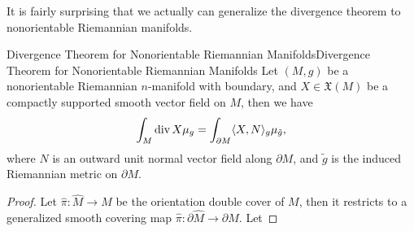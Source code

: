 \documentclass[../main.tex]{subfiles}
\begin{document}
It is fairly surprising that we actually can generalize the divergence theorem to nonorientable Riemannian manifolds.

\begin{theorem}{Divergence Theorem for Nonorientable Riemannian Manifolds}{Divergence Theorem for Nonorientable Riemannian Manifolds}
  Let $(M,g)$ be a nonorientable Riemannian $n$-manifold with boundary, and $X \in \mathfrak{X}(M)$ be a compactly supported smooth vector field on $M$, then we have
  \begin{equation}
    \int_M \operatorname{div} X \mu_g = \int_{\partial M} \langle X, N \rangle_g \mu_{\tilde{g}},
  \end{equation}
  where $N$ is an outward unit normal vector field along $\partial M$, and $\tilde{g}$ is the induced Riemannian metric on $\partial M$.
\end{theorem}
\begin{proof}
  Let $\hat{\pi}: \hat{M} \to M$ be the orientation double cover of $M$, then it restricts to a generalized smooth covering map $\hat{\pi}: \partial \hat{M} \to \partial M$. Let 
\end{proof}
\end{document}
